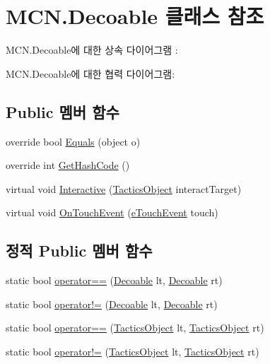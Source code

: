 \hypertarget{class_m_c_n_1_1_decoable}{}\section{M\+C\+N.\+Decoable 클래스 참조}
\label{class_m_c_n_1_1_decoable}


M\+C\+N.\+Decoable에 대한 상속 다이어그램 \+: 


M\+C\+N.\+Decoable에 대한 협력 다이어그램\+:
\subsection*{Public 멤버 함수}
\begin{DoxyCompactItemize}
\item 
override bool \hyperlink{class_m_c_n_1_1_decoable_a7c14e3879800d1f5d7e58a02e75540d9}{Equals} (object o)
\item 
override int \hyperlink{class_m_c_n_1_1_decoable_ad3068f4dce16b691595d54bb2f7a2d5c}{Get\+Hash\+Code} ()
\item 
virtual void \hyperlink{class_tactics_object_a5f94ed01497a7072a2785163f4cbc57b}{Interactive} (\hyperlink{class_tactics_object}{Tactics\+Object} interact\+Target)
\item 
virtual void \hyperlink{class_tactics_object_a0353d47981c71db7fe32bd414f025e9b}{On\+Touch\+Event} (\hyperlink{_touch_manager_8cs_ae33e321a424fe84ba8b2fdb81ad40a68}{e\+Touch\+Event} touch)
\end{DoxyCompactItemize}
\subsection*{정적 Public 멤버 함수}
\begin{DoxyCompactItemize}
\item 
static bool \hyperlink{class_m_c_n_1_1_decoable_a6004bbc5f208c3031388c9d6e8f8359b}{operator==} (\hyperlink{class_m_c_n_1_1_decoable}{Decoable} lt, \hyperlink{class_m_c_n_1_1_decoable}{Decoable} rt)
\item 
static bool \hyperlink{class_m_c_n_1_1_decoable_aa75e4102ebd7265f577028b407534d27}{operator!=} (\hyperlink{class_m_c_n_1_1_decoable}{Decoable} lt, \hyperlink{class_m_c_n_1_1_decoable}{Decoable} rt)
\item 
static bool \hyperlink{class_tactics_object_a18f2979a4bf81dc755fbc17e425809f0}{operator==} (\hyperlink{class_tactics_object}{Tactics\+Object} lt, \hyperlink{class_tactics_object}{Tactics\+Object} rt)
\item 
static bool \hyperlink{class_tactics_object_a49e235618a22126faa6271243cd89710}{operator!=} (\hyperlink{class_tactics_object}{Tactics\+Object} lt, \hyperlink{class_tactics_object}{Tactics\+Object} rt)
\end{DoxyCompactItemize}


